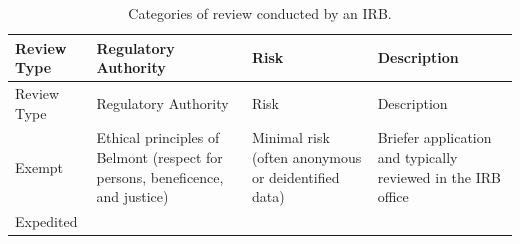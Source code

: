 \documentclass[
]{book}
\begin{document}
\begin{longtable}[]{@{}llll@{}}
\caption{\label{tab:irbtable1} Categories of review conducted by an IRB.}\tabularnewline
\toprule
\begin{minipage}[b]{0.16\columnwidth}\raggedright
Review
Type\strut
\end{minipage} & \begin{minipage}[b]{0.21\columnwidth}\raggedright
Regulatory
Authority\strut
\end{minipage} & \begin{minipage}[b]{0.22\columnwidth}\raggedright
Risk\strut
\end{minipage} & \begin{minipage}[b]{0.28\columnwidth}\raggedright
Description\strut
\end{minipage}\tabularnewline
\midrule
\endfirsthead
\toprule
\begin{minipage}[b]{0.16\columnwidth}\raggedright
Review
Type\strut
\end{minipage} & \begin{minipage}[b]{0.21\columnwidth}\raggedright
Regulatory
Authority\strut
\end{minipage} & \begin{minipage}[b]{0.22\columnwidth}\raggedright
Risk\strut
\end{minipage} & \begin{minipage}[b]{0.28\columnwidth}\raggedright
Description\strut
\end{minipage}\tabularnewline
\midrule
\endhead
\begin{minipage}[t]{0.16\columnwidth}\raggedright
Exempt\strut
\end{minipage} & \begin{minipage}[t]{0.21\columnwidth}\raggedright
Ethical
principles of
Belmont
(respect for
persons,
beneficence,
and justice)\strut
\end{minipage} & \begin{minipage}[t]{0.22\columnwidth}\raggedright
Minimal risk
(often
anonymous or
deidentified
data)\strut
\end{minipage} & \begin{minipage}[t]{0.28\columnwidth}\raggedright
Briefer application
and typically
reviewed in the IRB
office\strut
\end{minipage}\tabularnewline
\begin{minipage}[t]{0.16\columnwidth}\raggedright
Expedited\strut
\end{minipage} & \begin{minipage}[t]{0.21\columnwidth}\raggedright

\end{minipage}
\end{longtable}
\end{document}

